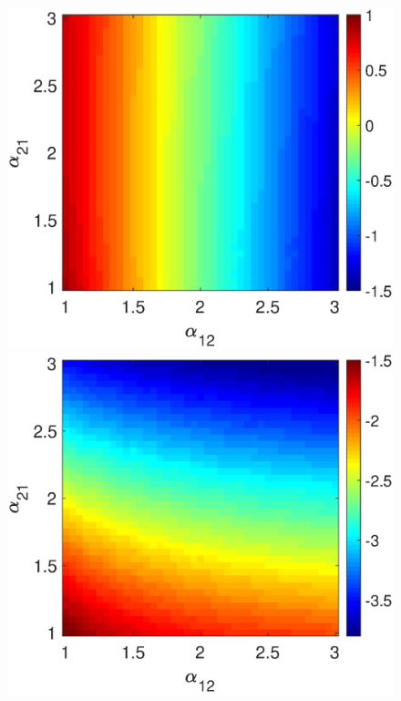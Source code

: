 \begin{figure}[h]
  \begin{minipage}{0.32\linewidth}
  \begin{center}
\includegraphics[width=1\linewidth]{Images/photo25_2.eps}
\end{center}
  \end{minipage} 
  \begin{minipage}{0.32\linewidth}
  \begin{center}
\includegraphics[width=1\linewidth]{Images/photo25_1.eps}
\end{center}


\end{minipage}
\end{figure}
